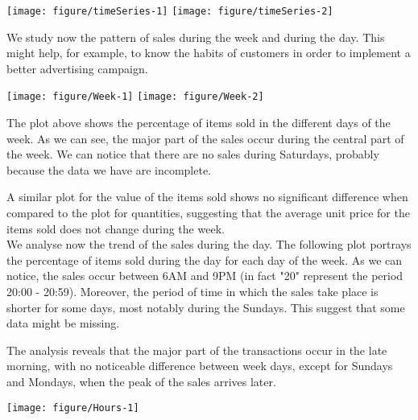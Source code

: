 \documentclass[12pt,a4paper,oneside,italian]{book}\usepackage{knitr}
\begin{document}
{\centering \texttt{[image: figure/timeSeries-1]} 
\texttt{[image: figure/timeSeries-2]} 

}





We study now the pattern of sales during the week and during the day. This might help, for example, to know the habits of customers in order to implement a better advertising campaign.
\\



{\centering \texttt{[image: figure/Week-1]} 
\texttt{[image: figure/Week-2]} 

}






The plot above shows the percentage of items sold in the different days of the week. As we can see, the major part of the sales occur during the central part of the week. We can notice that there are no sales during Saturdays, probably because the data we have are incomplete.

A similar plot for the value of the items sold shows no significant difference when compared to the plot for quantities, suggesting that the average unit price for the items sold does not change during the week.
\\
We analyse now the trend of the sales during the day. The following plot portrays the percentage of items sold during the day for each day of the week. As we can notice, the sales occur between 6AM and 9PM (in fact "20" represent the period 20:00 - 20:59).
Moreover, the period of time in which the sales take place is shorter for some days, most notably during the Sundays. This suggest that some data might be missing.

The analysis reveals that the major part of the transactions occur in the late morning, with no noticeable difference between week days, except for Sundays and Mondays, when the peak of the sales arrives later.
\\





{\centering \texttt{[image: figure/Hours-1]} 

}
\end{document}
